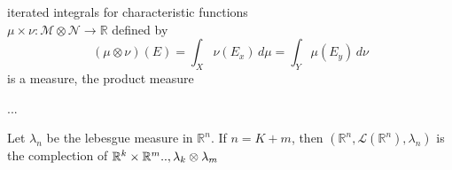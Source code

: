 \begin{theorem}
    iterated integrals for characteristic functions \\ 
    \(\mu \times \nu : \mathcal{M} \otimes \mathcal{N} \rightarrow \mathbb{R} \) defined by
    \[ \left(\mu \otimes \nu \right)(E) = \int_X \nu(E_x) \, d\mu = \int_Y \mu(E_y) \, d\nu\]
    is a measure, the product measure 
\end{theorem}

...
\begin{theorem}
    Let \(\lambda_n\) be the lebesgue measure in \(\mathbb{R}^n\). If \(n= K+m\), then \(\left(\mathbb{R}^n, \mathcal{L}(\mathbb{R}^n), \lambda_n \right)\) is the complection of \(\mathbb{R}^k \times \mathbb{R}^m .., \lambda_k \otimes \lambda_m\)
\end{theorem}
